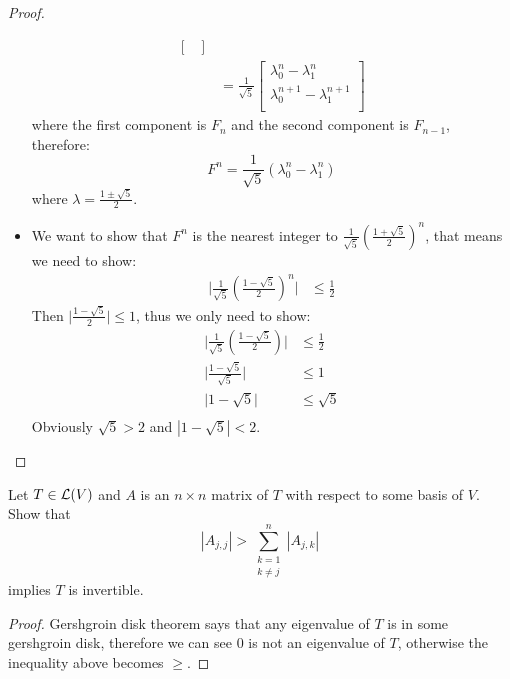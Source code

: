 \documentclass[../main.tex]{subfiles}
\begin{document}
\begin{proof}
\begin{itemize}
\begin{align*}
\begin{bmatrix}
            \end{bmatrix} \\
            &=
            \frac{1}{\sqrt{5}}
            \begin{bmatrix}
              \lambda_0^n - \lambda_1^n \\
              \lambda_0^{n + 1} - \lambda_1^{n + 1} \\
            \end{bmatrix}
          \end{align*}
          where the first component is $F_n$ and the second component is $F_{n - 1}$,
          therefore:
          \[
          F^n = \frac{1}{\sqrt{5}}(\lambda_0^n - \lambda_1^n)
          \]
          where $\lambda = \frac{1 \pm \sqrt{5}}{2}$.
    \item We want to show that $F^n$ is the nearest integer to $\frac{1}{\sqrt{5}}(\frac{1 + \sqrt{5}}{2})^n$,
          that means we need to show:
          \begin{align*}
            \big|\frac{1}{\sqrt{5}}(\frac{1 - \sqrt{5}}{2})^n\big| & \le \frac{1}{2}
          \end{align*}
          Then $\big|\frac{1 - \sqrt{5}}{2}\big| \le 1$, thus we only need to show:
          \begin{align*}
            \big|\frac{1}{\sqrt{5}}(\frac{1 - \sqrt{5}}{2})\big| & \le \frac{1}{2} \\
            \big|\frac{1 - \sqrt{5}}{\sqrt{5}}\big| & \le 1 \\
            \big|1 - \sqrt{5}\big| & \le \sqrt{5} \\
          \end{align*}
          Obviously $\sqrt{5} > 2$ and $|1 - \sqrt{5}| < 2$.
  \end{itemize}
\end{proof}

\begin{exercise}
  Let $T \in \mathcal{L}(V)$ and $A$ is an $n \times n$ matrix of $T$ with respect to some basis of $V$.
  Show that
  \[
  |A_{j, j}| > \sum^{n}_{\substack{k = 1 \\ k \neq j}} |A_{j, k}|
  \]
  implies $T$ is invertible.
\end{exercise}
\begin{proof}
  Gershgroin disk theorem says that any eigenvalue of $T$ is in some gershgroin disk,
  therefore we can see $0$ is not an eigenvalue of $T$, otherwise the inequality above
  becomes $\ge$.
\end{proof}
\end{document}
